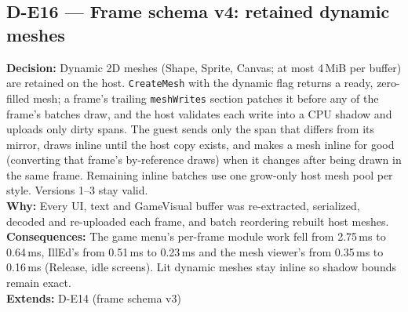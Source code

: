 \subsection*{D-E16 --- Frame schema v4: retained dynamic meshes}
\begin{decisionbox}[title={D-E16 \quad 2026-09-22}]
\textbf{Decision:} Dynamic 2D meshes (Shape, Sprite, Canvas; at most 4\,MiB
per buffer) are retained on the host. \texttt{CreateMesh} with the dynamic
flag returns a ready, zero-filled mesh; a frame's trailing
\texttt{meshWrites} section patches it before any of the frame's batches draw,
and the host validates each write into a CPU shadow and uploads only dirty
spans. The guest sends only the span that differs from its mirror, draws
inline until the host copy exists, and makes a mesh inline for good (converting
that frame's by-reference draws) when it changes after being drawn in the same
frame. Remaining inline batches use one grow-only host mesh pool per style.
Versions 1--3 stay valid.\\
\textbf{Why:} Every UI, text and GameVisual buffer was re-extracted,
serialized, decoded and re-uploaded each frame, and batch reordering rebuilt
host meshes.\\
\textbf{Consequences:} The game menu's per-frame module work fell from
2.75\,ms to 0.64\,ms, IllEd's from 0.51\,ms to 0.23\,ms and the mesh viewer's
from 0.35\,ms to 0.16\,ms (Release, idle screens). Lit dynamic meshes stay
inline so shadow bounds remain exact.\\
\textbf{Extends:} D-E14 (frame schema v3)
\end{decisionbox}

